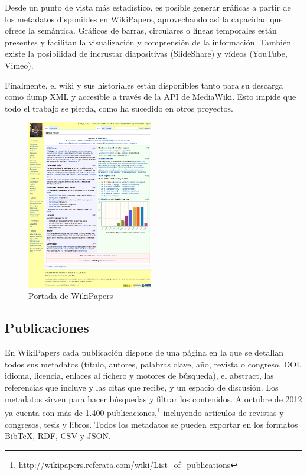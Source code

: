 \documentclass[11pt,twocolumn]{article}
\begin{document}
Desde un punto de vista más estadístico, es posible generar gráficas a partir de los metadatos disponibles en WikiPapers, aprovechando así la capacidad que ofrece la semántica. Gráficos de barras, circulares o líneas temporales están presentes y facilitan la visualización y comprensión de la información. También existe la posibilidad de incrustar diapositivas (SlideShare) y vídeos (YouTube, Vimeo).

Finalmente, el wiki y sus historiales están disponibles tanto para su descarga como dump XML y accesible a través de la API de MediaWiki. Esto impide que todo el trabajo se pierda, como ha sucedido en otros proyectos.

\begin{figure}[htb]
\centering
\includegraphics[width=0.49\textwidth]{wpfull.png}
\caption{Portada de WikiPapers}
\label{fig:wpfull}
\end{figure}

\subsection{Publicaciones}
En WikiPapers cada publicación dispone de una página en la que se detallan todos sus metadatos (título, autores, palabras clave, año, revista o congreso, DOI, idioma, licencia, enlaces al fichero y motores de búsqueda), el abstract, las referencias que incluye y las citas que recibe, y un espacio de discusión. Los metadatos sirven para hacer búsquedas y filtrar los contenidos. A octubre de 2012 ya cuenta con más de 1.400 publicaciones,\footnote{\href{http://wikipapers.referata.com/wiki/List_of_publications}{http://wikipapers.referata.com/wiki/List\_of\_publications}} incluyendo artículos de revistas y congresos, tesis y libros. Todos los metadatos se pueden exportar en los formatos BibTeX, RDF, CSV y JSON.
\end{document}
